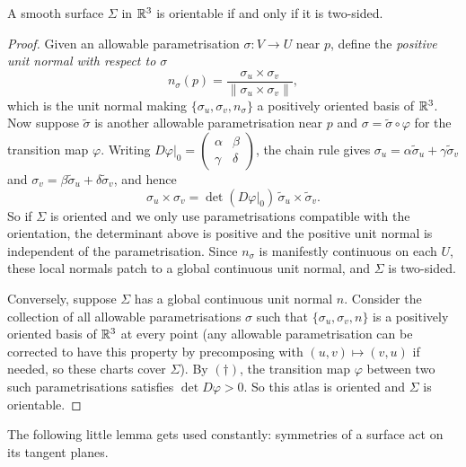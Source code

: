 \documentclass[a4paper]{scrartcl}
\begin{document}
\begin{lemma}
    A smooth surface $\Sigma$ in $\mathbb{R}^3$ is orientable if and only if it is two-sided.
\end{lemma}
\begin{proof}
    Given an allowable parametrisation $\sigma: V \rightarrow U$ near $p$, define the \emph{positive unit normal with respect to $\sigma$}
    $$
    n_{\sigma}(p) = \frac{\sigma_u \times \sigma_v}{\|\sigma_u \times \sigma_v\|},
    $$
    which is the unit normal making $\{\sigma_u, \sigma_v, n_\sigma\}$ a positively oriented basis of $\mathbb{R}^3$. Now suppose $\tilde{\sigma}$ is another allowable parametrisation near $p$ and $\sigma = \tilde{\sigma} \circ \varphi$ for the transition map $\varphi$. Writing $\left.D\varphi\right|_0 = \begin{pmatrix} \alpha & \beta \\ \gamma & \delta\end{pmatrix}$, the chain rule gives $\sigma_u = \alpha \tilde{\sigma}_u + \gamma \tilde{\sigma}_v$ and $\sigma_v = \beta \tilde{\sigma}_u + \delta \tilde{\sigma}_v$, and hence
    \begin{equation}
    \sigma_u \times \sigma_v = \det\left(\left.D\varphi\right|_0\right) \, \tilde{\sigma}_u \times \tilde{\sigma}_v. \tag{$\dagger$}
    \end{equation}
    So if $\Sigma$ is oriented and we only use parametrisations compatible with the orientation, the determinant above is positive and the positive unit normal is independent of the parametrisation. Since $n_\sigma$ is manifestly continuous on each $U$, these local normals patch to a global continuous unit normal, and $\Sigma$ is two-sided.

    Conversely, suppose $\Sigma$ has a global continuous unit normal $n$. Consider the collection of all allowable parametrisations $\sigma$ such that $\{\sigma_u, \sigma_v, n\}$ is a positively oriented basis of $\mathbb{R}^3$ at every point (any allowable parametrisation can be corrected to have this property by precomposing with $(u, v) \mapsto (v, u)$ if needed, so these charts cover $\Sigma$). By $(\dagger)$, the transition map $\varphi$ between two such parametrisations satisfies $\det D\varphi > 0$. So this atlas is oriented and $\Sigma$ is orientable.
\end{proof}

The following little lemma gets used constantly: symmetries of a surface act on its tangent planes.
\end{document}
